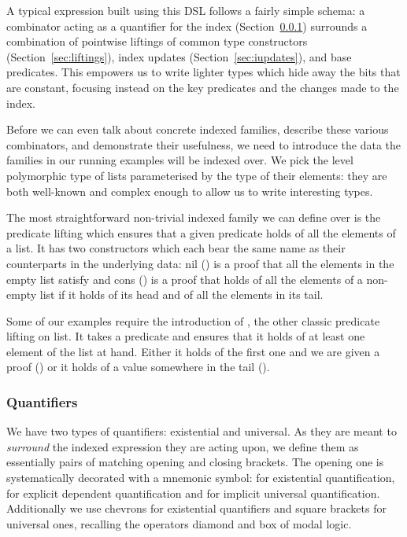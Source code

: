 A typical expression built using this DSL follows a fairly simple schema:
a combinator acting as a quantifier for the index (Section~\ref{sec:quantifiers})
surrounds a combination of pointwise liftings of common type constructors
(Section~\ref{sec:liftings}), index updates (Section~\ref{sec:iupdates}),
and base predicates. This empowers us to write lighter types which hide
away the bits that are constant, focusing instead on the key predicates
and the changes made to the index.

Before we can even talk about concrete indexed families, describe these
various combinators, and demonstrate their usefulness, we need to
introduce the data the families in our running examples will be indexed
over. We pick  the level polymorphic type of lists parameterised
by the type of their elements: they are both well-known and complex enough
to allow us to write interesting types.


The most straightforward non-trivial indexed family we can define over
 is the predicate lifting  which ensures that a given
predicate  holds of all the elements of a list. It has two
constructors which each bear the same name as their counterparts in the
underlying data: nil (\AIC{[]}) is a proof that all the elements in the
empty list satisfy  and cons (\AIC{\_::\_}) is a proof that 
holds of all the elements of a non-empty list if it holds of its head
and of all the elements in its tail.


Some of our examples require the introduction of , the other classic
predicate lifting on list. It takes a predicate and ensures that it holds of
at least one element of the list at hand. Either it holds of the first one
and we are given a proof () or it holds of a value somewhere in the
tail ().


\subsubsection{Quantifiers}\label{sec:quantifiers}

We have two types of quantifiers: existential and universal. As they are
meant to \emph{surround} the indexed expression they are acting upon, we
define them as essentially pairs of matching opening and closing brackets.
The opening one is systematically decorated with a mnemonic symbol: 
for existential quantification,  for explicit dependent quantification
and  for implicit universal quantification. Additionally we use chevrons
for existential quantifiers and square brackets for universal ones, recalling
the operators diamond and box of modal logic.

